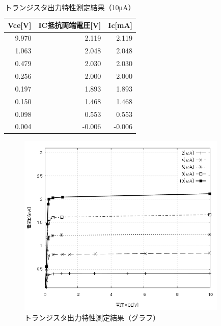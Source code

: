 \documentclass[titlepage]{jarticle}
\begin{document}
\begin{table}[htbp]
    \caption{トランジスタ出力特性測定結果（10μA）}
    \begin{center}
        \begin{tabular}{r|r|r}
            \hline
            \multicolumn{1}{l|}{Vce[V]} & \multicolumn{1}{l|}{IC抵抗両端電圧[V]} & \multicolumn{1}{l}{Ic[mA]} \\ \hline
            9.970                       & 2.119                                  & 2.119                      \\ \hline
            1.063                       & 2.048                                  & 2.048                      \\ \hline
            0.479                       & 2.030                                  & 2.030                      \\ \hline
            0.256                       & 2.000                                  & 2.000                      \\ \hline
            0.197                       & 1.893                                  & 1.893                      \\ \hline
            0.150                       & 1.468                                  & 1.468                      \\ \hline
            0.098                       & 0.553                                  & 0.553                      \\ \hline
            0.004                       & -0.006                                 & -0.006                     \\ \hline
        \end{tabular}
    \end{center}
    \label{トランジスタ出力特性測定結果（10μA）}
\end{table}


\begin{figure}[H]
    \begin{center}
        \includegraphics[width=10cm]{graph/6.png}
        \caption{トランジスタ出力特性測定結果（グラフ）}
        \label{fig:トランジスタ出力特性測定結果（グラフ）}
    \end{center}
\end{figure}
\end{document}
